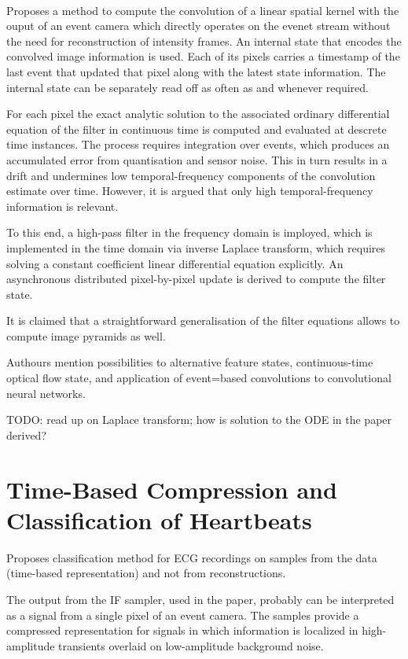 \documentclass[10pt,a4paper]{article}
\begin{document}
\paragraph{}
Proposes a method to compute the convolution of a linear spatial kernel with the ouput of an event camera which directly operates on the evenet stream without the need for reconstruction of intensity frames.
An internal state that encodes the convolved image information is used. Each of its pixels carries a timestamp of the last event that updated that pixel along with the latest state information.
The internal state can be separately read off as often as and whenever required.

For each pixel the exact analytic solution to the associated ordinary differential equation of the filter in continuous time is computed and evaluated at descrete time instances.
The process requires integration over events, which produces an accumulated error from quantisation and sensor noise.
This in turn results in a drift and undermines low temporal-frequency components of the convolution estimate over time.
However, it is argued that only high temporal-frequency information is relevant.

To this end, a high-pass filter in the frequency domain is imployed, which is implemented in the time domain via inverse Laplace transform, which requires solving a constant coefficient linear differential equation explicitly.
An asynchronous distributed pixel-by-pixel update is derived to compute the filter state.

It is claimed that a straightforward generalisation of the filter equations allows to compute image pyramids as well.

Authours mention possibilities to alternative feature states, continuous-time optical flow state, and application of event=based convolutions to convolutional neural networks.

TODO: read up on Laplace transform; how is solution to the ODE in the paper derived?

\section{Time-Based Compression and Classification of Heartbeats}
Proposes classification method for ECG recordings on samples from the data (time-based representation) and not from reconstructions.

The output from the IF sampler, used in the paper, probably can be interpreted as a signal from a single pixel of an event camera.
The samples provide a compressed representation for signals in which information is localized in high-amplitude transients overlaid on low-amplitude background noise.
\end{document}
